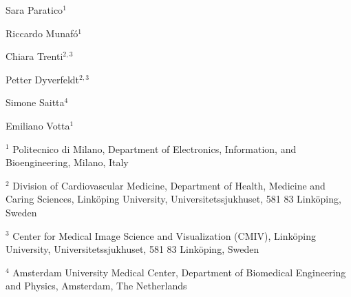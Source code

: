 %                                                    
%                                                    
%                                                    
\contributors

\begin{thecontriblist}
Sara Paratico$^1$

Riccardo Munaf\'o$^1$

Chiara Trenti$^{2,3}$

Petter Dyverfeldt$^{2,3}$

Simone Saitta$^4$

Emiliano Votta$^1$

\vspace{1cm}

$^1$ Politecnico di Milano, Department of Electronics, Information, and Bioengineering, Milano, Italy

$^2$  Division of Cardiovascular Medicine, Department of Health, Medicine and Caring Sciences, Link\"oping University, Universitetssjukhuset, 581 83 Linköping, Sweden

$^3$  Center for Medical Image Science and Visualization (CMIV), Link\"oping University, 
Universitetssjukhuset, 581 83 Linköping, Sweden

$^4$ Amsterdam University Medical Center, 
Department of Biomedical Engineering and Physics, Amsterdam, The Netherlands

\end{thecontriblist}
